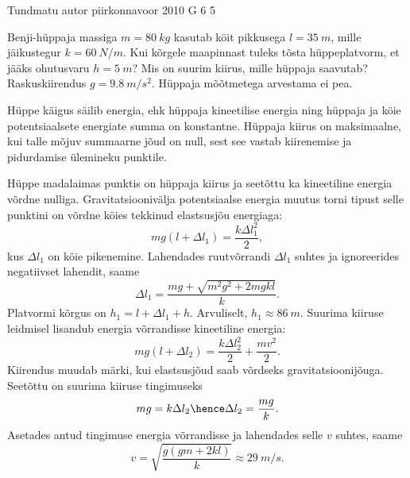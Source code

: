 {Tundmatu autor} %
{piirkonnavoor} %
{2010} %
{G 6} %
{5} %
{
\ifStatement
Benji-hüppaja massiga $m=\SI{80}{kg}$ kasutab köit pikkusega $l=\SI{35}{m}$, mille jäikustegur $k=\SI{60}{N/m}$. Kui kõrgele maapinnast tuleks tõsta hüppeplatvorm, et jääks ohutusvaru $h=\SI{5}{m}$? Mis on suurim kiirus, mille hüppaja saavutab? Raskuskiirendus $g=\SI{9.8}{m/s^2}$. Hüppaja mõõtmetega arvestama ei pea. 
\fi


\ifHint
Hüppe käigus säilib energia, ehk hüppaja kineetilise energia ning hüppaja ja köie potentsiaalsete energiate summa on konstantne. Hüppaja kiirus on maksimaalne, kui talle mõjuv summaarne jõud on null, sest see vastab kiirenemise ja pidurdamise ülemineku punktile.
\fi


\ifSolution
Hüppe madalaimas punktis on hüppaja kiirus ja seetõttu ka kineetiline energia võrdne nulliga. Gravitatsioonivälja potentsiaalse energia muutus torni tipust selle punktini on võrdne köies tekkinud elastsusjõu energiaga:
\[
mg(l+\Delta l_1)=\frac{k\Delta l_1^2}{2},
\]
kus $\Delta l_1$ on köie pikenemine. Lahendades ruutvõrrandi $\Delta l_1$ suhtes ja ignoreerides negatiivset lahendit, saame
\[
\Delta l_1=\frac{mg+\sqrt{m^2g^2+2mgkl}}{k}.
\]
Platvormi kõrgus on $h_1=l+\Delta l_1+h$.
Arvuliselt, $h_1\approx \SI{86}{m}$.
Suurima kiiruse leidmisel lisandub energia võrrandisse kineetiline energia:
\[
mg(l+\Delta l_2)=\frac{k\Delta l_2^2}{2}+\frac{mv^2}{2}.
\]
Kiirendus muudab märki, kui elastsusjõud saab võrdseks gravitatsioonijõuga. Seetõttu on suurima kiiruse tingimuseks
\[
mg=k\Delta l_2 \hence \Delta l_2=\frac{mg}{k}.
\]
Asetades antud tingimuse energia võrrandisse ja lahendades selle $v$ suhtes, saame
\[
v=\sqrt{\frac{g(gm+2kl)}{k}} \approx \SI{29}{m/s}.
\]
\fi
}